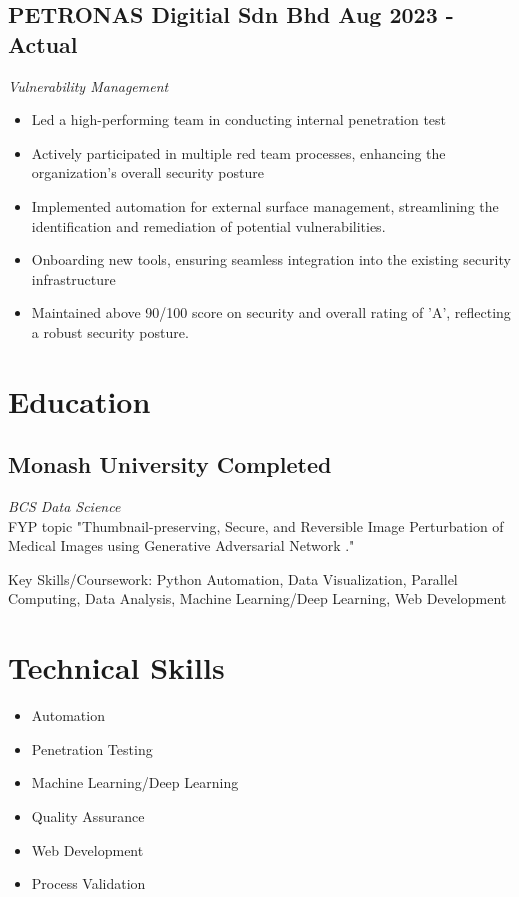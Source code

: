 \documentclass[a4paper,10pt]{article}
\begin{document}
	\subsection*{PETRONAS Digitial Sdn Bhd \hfill Aug 2023 - Actual}
	\textit{Vulnerability Management}
	\begin{itemize}
		\item Led a high-performing team in conducting internal penetration test
		\item Actively participated in multiple red team processes, enhancing the organization's overall security posture
		\item Implemented automation for external surface management, streamlining the identification and remediation of potential vulnerabilities.
		\item Onboarding new tools, ensuring seamless integration into the existing security infrastructure
		\item Maintained above 90/100 score on security and overall rating of 'A', reflecting a robust security posture.
	\end{itemize}
	
	\section*{ Education}
	
	\subsection*{Monash University \hfill Completed}
	\textit{BCS Data Science}\\
	FYP topic "Thumbnail-preserving, Secure, and Reversible Image Perturbation of Medical Images using Generative Adversarial Network ."
	
	Key Skills/Coursework: Python Automation, Data Visualization, Parallel Computing, Data Analysis, Machine Learning/Deep Learning, Web Development
	
	\section*{ Technical Skills}
	\begin{center}
		\begin{itemize}[label=, itemsep=-3pt]
			\item Automation
			\item Penetration Testing
			\item Machine Learning/Deep Learning
			\item Quality Assurance
			\item Web Development
			\item Process Validation
		\end{itemize}
	\end{center}
	
\end{document}
